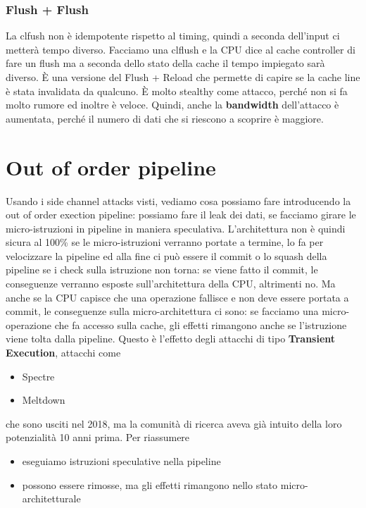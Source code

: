 \documentclass[12pt, oneside]{extbook} %
\begin{document}
\subsubsection{Flush + Flush}
La clfush non è idempotente rispetto al timing, quindi a seconda dell'input ci metterà tempo diverso. Facciamo una clflush e la CPU dice al cache controller di fare un flush ma a seconda dello stato della cache il tempo impiegato sarà diverso. È una versione del Flush + Reload che permette di capire se la cache line è stata invalidata da qualcuno. È molto stealthy come attacco, perché non si fa molto rumore ed inoltre è veloce. Quindi, anche la \textbf{bandwidth} dell'attacco è aumentata, perché il numero di dati che si riescono a scoprire è maggiore.
\section{Out of order pipeline}
Usando i side channel attacks visti, vediamo cosa possiamo fare introducendo la out of order exection pipeline: possiamo fare il leak dei dati, se facciamo girare le micro-istruzioni in pipeline in maniera speculativa. L'architettura non è quindi sicura al 100\% se le micro-istruzioni verranno portate a termine, lo fa per velocizzare la pipeline ed alla fine ci può essere il commit o lo squash della pipeline se i check sulla istruzione non torna: se viene fatto il commit, le conseguenze verranno esposte sull'architettura della CPU, altrimenti no. Ma anche se la CPU capisce che una operazione fallisce e non deve essere portata a commit, le conseguenze sulla micro-architettura ci sono: se facciamo una micro-operazione che fa accesso sulla cache, gli effetti rimangono anche se l'istruzione viene tolta dalla pipeline. Questo è l'effetto degli attacchi di tipo \textbf{Transient Execution}, attacchi come
\begin{itemize}
\item Spectre
\item Meltdown
\end{itemize}
che sono usciti nel 2018, ma la comunità di ricerca aveva già intuito della loro potenzialità 10 anni prima. Per riassumere
\begin{itemize}
\item eseguiamo istruzioni speculative nella pipeline
\item possono essere rimosse, ma gli effetti rimangono nello stato micro-architetturale
\end{itemize}
\end{document}

